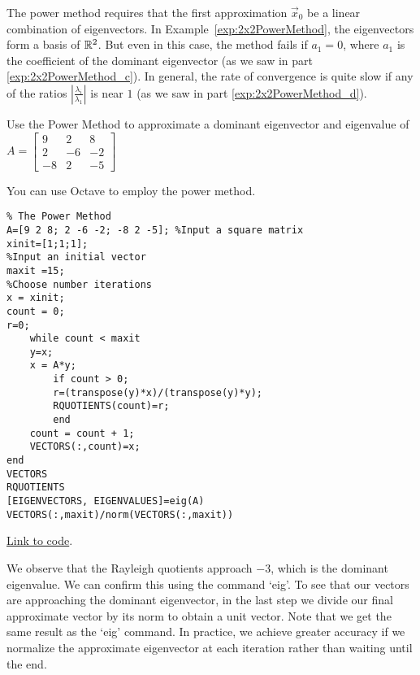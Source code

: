 \documentclass{ximera}
\begin{document}
The power method requires that the first approximation $\vec{x}_{0}$ be a linear combination of eigenvectors. In Example~\ref{exp:2x2PowerMethod}, the eigenvectors form a basis of $\mathbb{R}^2$. But even in this case, the method fails if $a_{1} = 0$, where $a_{1}$ is the coefficient of the dominant eigenvector (as we saw in part \ref{exp:2x2PowerMethod_c}). In general, the rate of convergence is quite slow if any of the ratios $\left| \frac{\lambda_{i}}{\lambda_{1}} \right|$ is near $1$ (as we saw in part \ref{exp:2x2PowerMethod_d}). 


\begin{exploration}\label{exp:3x3PowerMethod}
Use the Power Method to approximate a dominant eigenvector and eigenvalue of $A = \left[ \begin{array}{rrr}
9 & 2 & 8 \\
2 & -6 & -2 \\
-8 & 2 & -5
\end{array}\right]$

You can use Octave to employ the power method.

\begin{verbatim}
% The Power Method
A=[9 2 8; 2 -6 -2; -8 2 -5]; %Input a square matrix
xinit=[1;1;1];
%Input an initial vector
maxit =15;
%Choose number iterations
x = xinit;
count = 0;
r=0;
    while count < maxit
    y=x;
    x = A*y;
        if count > 0; 
        r=(transpose(y)*x)/(transpose(y)*y);
        RQUOTIENTS(count)=r;
        end
    count = count + 1;
    VECTORS(:,count)=x;
end
VECTORS
RQUOTIENTS
[EIGENVECTORS, EIGENVALUES]=eig(A)
VECTORS(:,maxit)/norm(VECTORS(:,maxit))
\end{verbatim}

\href{https://sagecell.sagemath.org/?z=eJxdUF9LwzAQfy_0O9zLoJkrs4PJtEYoo8hAN107X0of4hZtYE1mmrr225u0mZte4HJ3vz85MoC0oPAijlTCM1WF2LlOhLNbmMAs1Mm_AX8Sgj8z9TQPYbDgh1oBgeqrJpJCSZRkjes0jDOFsyDUJw9d58TjYABG9vBNt0pI1ylJwxTgYGpY80KIigKvy3e9AVNUEsUEr7QhYOhMNW0raq4lcK1riU0GHceC7Sn02D10tj3Q4sZSjEk0bG1ngn1YxYN2g_NcYk9JwquDXsdr0bBB47-DFl24rF83q3QRL9PE69wQlhco5bu-Oe3d31cQWNJbPE9X68S7G1m12bdTWcR1zi-4ThYvHuOlhUbQd9HTJk5yTNmnF6FfobbsPgKNuZCl93-KfgAGNIiM&lang=octave&interacts=eJyLjgUAARUAuQ==}{Link to code}.

We observe that the Rayleigh quotients approach $-3$, which is the dominant eigenvalue.  We can confirm this using the command `eig'.  To see that our vectors are approaching the dominant eigenvector, in the last step we divide our final approximate vector by its norm to obtain a unit vector. Note that we get the same result as the `eig' command.  In practice, we achieve greater accuracy if we normalize the approximate eigenvector at each iteration rather than waiting until the end.

\end{exploration}
\end{document}
